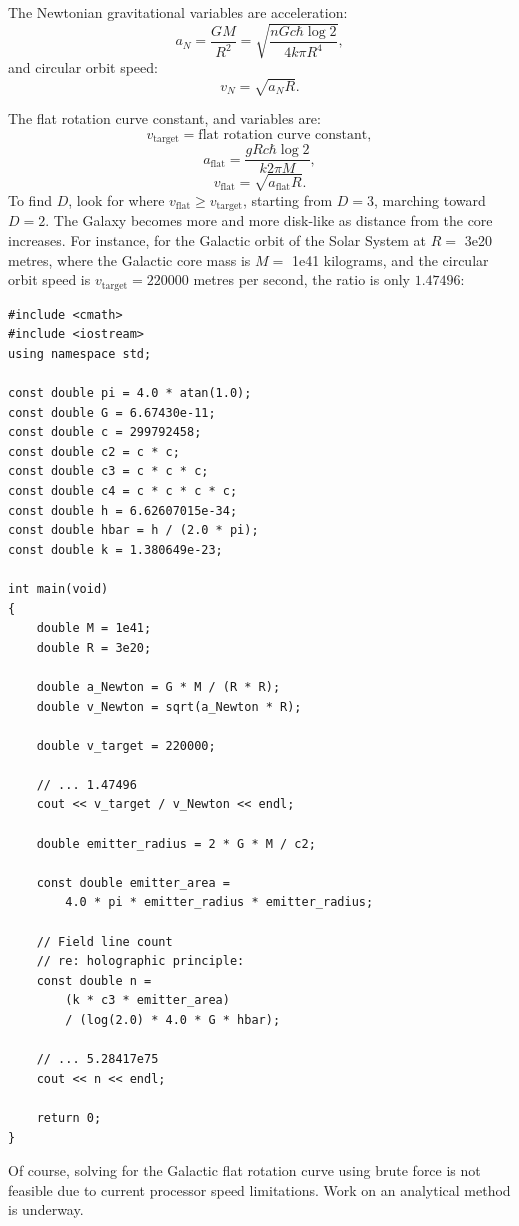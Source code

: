 \documentclass[12pt]{article}
\begin{document}
The Newtonian gravitational variables are acceleration:
\begin{equation}
a_N = \frac{G M}{R^2} = \sqrt{\frac{n G c \hbar \log 2}{4 k \pi R^4}},
\end{equation}
and circular orbit speed:
\begin{equation}
v_N = \sqrt{a_N R}.
\end{equation}

The flat rotation curve constant, and variables are:
\begin{equation}
v_{\textrm{target}} = {\textrm {flat rotation curve constant}}, %
\end{equation}
\begin{equation}
a_{\textrm{flat}} = \frac{g R c \hbar \log 2}{k 2 \pi M},
\end{equation}
\begin{equation}
v_{\textrm{flat}} = \sqrt{a_{\textrm{flat}} R}.
\end{equation}
To find $D$, look for where $v_{\textrm{flat}} \geq v_{\textrm{target}}$, starting from $D = 3$, marching toward $D = 2$.
The Galaxy becomes more and more disk-like as distance from the core increases.
For instance, for the Galactic orbit of the Solar System at $R = $ 3e20 metres, where the Galactic core mass is $M = $ 1e41 kilograms, and the circular orbit speed is $v_{\textrm{target}} = 220000$ metres per second, the ratio is only $1.47496$:
\begin{lstlisting}
#include <cmath>
#include <iostream>
using namespace std;

const double pi = 4.0 * atan(1.0);
const double G = 6.67430e-11;
const double c = 299792458;
const double c2 = c * c;
const double c3 = c * c * c;
const double c4 = c * c * c * c;
const double h = 6.62607015e-34;
const double hbar = h / (2.0 * pi);
const double k = 1.380649e-23;

int main(void)
{
	double M = 1e41;
	double R = 3e20;

	double a_Newton = G * M / (R * R);
	double v_Newton = sqrt(a_Newton * R);

	double v_target = 220000;

	// ... 1.47496
	cout << v_target / v_Newton << endl;

	double emitter_radius = 2 * G * M / c2;

	const double emitter_area =
		4.0 * pi * emitter_radius * emitter_radius;

	// Field line count
	// re: holographic principle:
	const double n =
		(k * c3 * emitter_area)
		/ (log(2.0) * 4.0 * G * hbar);

	// ... 5.28417e75
	cout << n << endl;

	return 0;
}
\end{lstlisting}
Of course, solving for the Galactic flat rotation curve using brute force is not feasible due to current processor speed limitations.
Work on an analytical method is underway.
\end{document}
